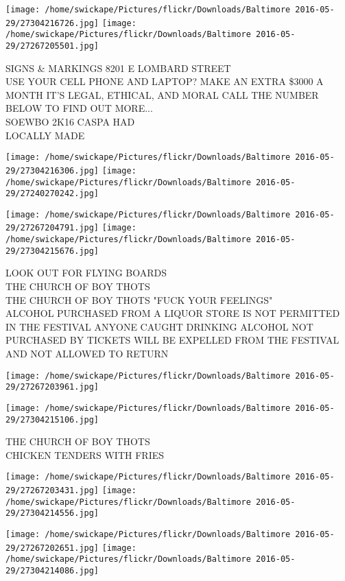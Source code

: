 \documentclass[10pt,letterpaper]{article}
\begin{document}
\texttt{[image: /home/swickape/Pictures/flickr/Downloads/Baltimore 2016-05-29/27304216726.jpg]}
\texttt{[image: /home/swickape/Pictures/flickr/Downloads/Baltimore 2016-05-29/27267205501.jpg]}

SIGNS \& MARKINGS 8201 E LOMBARD STREET\\
USE YOUR CELL PHONE AND LAPTOP?  MAKE AN EXTRA \$3000 A MONTH IT'S LEGAL, ETHICAL, AND MORAL CALL THE NUMBER BELOW TO FIND OUT MORE...\\
SOEWBO 2K16 CASPA HAD\\
LOCALLY MADE
\pagebreak

\texttt{[image: /home/swickape/Pictures/flickr/Downloads/Baltimore 2016-05-29/27304216306.jpg]}
\texttt{[image: /home/swickape/Pictures/flickr/Downloads/Baltimore 2016-05-29/27240270242.jpg]}

\texttt{[image: /home/swickape/Pictures/flickr/Downloads/Baltimore 2016-05-29/27267204791.jpg]}
\texttt{[image: /home/swickape/Pictures/flickr/Downloads/Baltimore 2016-05-29/27304215676.jpg]}

LOOK OUT FOR FLYING BOARDS\\
THE CHURCH OF BOY THOTS\\
THE CHURCH OF BOY THOTS "FUCK YOUR FEELINGS"\\
ALCOHOL PURCHASED FROM A LIQUOR STORE IS NOT PERMITTED IN THE FESTIVAL ANYONE CAUGHT DRINKING ALCOHOL NOT PURCHASED BY TICKETS WILL BE EXPELLED FROM THE FESTIVAL AND NOT ALLOWED TO RETURN
\pagebreak

\texttt{[image: /home/swickape/Pictures/flickr/Downloads/Baltimore 2016-05-29/27267203961.jpg]}

\vspace{0.25in}
\texttt{[image: /home/swickape/Pictures/flickr/Downloads/Baltimore 2016-05-29/27304215106.jpg]}

THE CHURCH OF BOY THOTS\\
CHICKEN TENDERS WITH FRIES
\pagebreak

\texttt{[image: /home/swickape/Pictures/flickr/Downloads/Baltimore 2016-05-29/27267203431.jpg]}
\texttt{[image: /home/swickape/Pictures/flickr/Downloads/Baltimore 2016-05-29/27304214556.jpg]}

\texttt{[image: /home/swickape/Pictures/flickr/Downloads/Baltimore 2016-05-29/27267202651.jpg]}
\texttt{[image: /home/swickape/Pictures/flickr/Downloads/Baltimore 2016-05-29/27304214086.jpg]}
\end{document}
